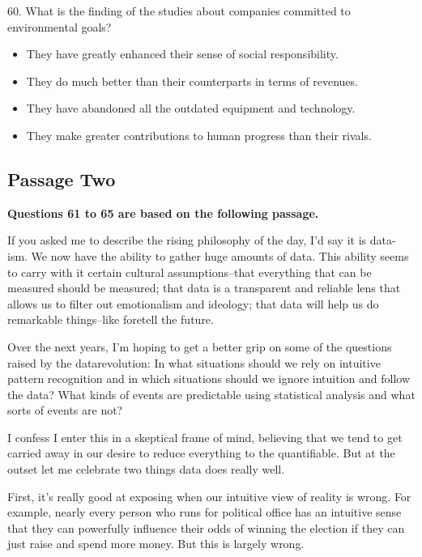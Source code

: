 \documentclass[UTF8,11pt]{ctexart}
\begin{document}
60. What is the finding of the studies about companies committed to environmental goals?


\begin{itemize}[leftmargin=2em,itemsep=.2em,topsep=.4em]\item[A.] They have greatly enhanced their sense of social responsibility.
\item[B.] They do much better than their counterparts in terms of revenues.
\item[C.] They have abandoned all the outdated equipment and technology.
\item[D.] They make greater contributions to human progress than their rivals.
\end{itemize}

\subsection*{\textbf{Passage Two}}


\textbf{Questions 61 to 65 are based on the following passage.}


If you asked me to describe the rising philosophy of the day, I'd say it is data-ism. We now have the ability to gather huge amounts of data. This ability seems to carry with it certain cultural assumptions--that everything that can be measured should be measured; that data is a transparent and reliable lens that allows us to filter out emotionalism and ideology; that data will help us do remarkable things--like foretell the future.


Over the next years, I'm hoping to get a better grip on some of the questions raised by the datarevolution: In what situations should we rely on intuitive pattern recognition and in which situations should we ignore intuition and follow the data? What kinds of events are predictable using statistical analysis and what sorts of events are not?


I confess I enter this in a skeptical frame of mind, believing that we tend to get carried away in our desire to reduce everything to the quantifiable. But at the outset let me celebrate two things data does really well.


First, it's really good at exposing when our intuitive view of reality is wrong. For example, nearly every person who runs for political office has an intuitive sense that they can powerfully influence their odds of winning the election if they can just raise and spend more money. But this is largely wrong.
\end{document}
